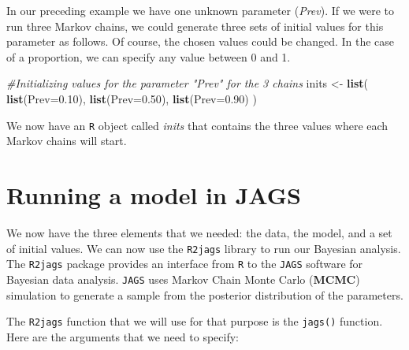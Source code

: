 \documentclass[
]{book}
\newenvironment{Shaded}{\begin{snugshade}}{\end{snugshade}}
\newcommand{\AttributeTok}[1]{\textcolor[rgb]{0.13,0.29,0.53}{#1}}
\newcommand{\CommentTok}[1]{\textcolor[rgb]{0.56,0.35,0.01}{\textit{#1}}}
\newcommand{\FloatTok}[1]{\textcolor[rgb]{0.00,0.00,0.81}{#1}}
\newcommand{\FunctionTok}[1]{\textcolor[rgb]{0.13,0.29,0.53}{\textbf{#1}}}
\newcommand{\NormalTok}[1]{#1}
\newcommand{\OtherTok}[1]{\textcolor[rgb]{0.56,0.35,0.01}{#1}}
\begin{document}
In our preceding example we have one unknown parameter (\emph{Prev}). If we were to run three Markov chains, we could generate three sets of initial values for this parameter as follows. Of course, the chosen values could be changed. In the case of a proportion, we can specify any value between 0 and 1.

\begin{Shaded}
\begin{Highlighting}[]
\CommentTok{\#Initializing values for the parameter "Prev" for the 3 chains}
\NormalTok{inits }\OtherTok{\textless{}{-}} \FunctionTok{list}\NormalTok{(}
  \FunctionTok{list}\NormalTok{(}\AttributeTok{Prev=}\FloatTok{0.10}\NormalTok{),}
  \FunctionTok{list}\NormalTok{(}\AttributeTok{Prev=}\FloatTok{0.50}\NormalTok{),}
  \FunctionTok{list}\NormalTok{(}\AttributeTok{Prev=}\FloatTok{0.90}\NormalTok{)}
\NormalTok{  )}
\end{Highlighting}
\end{Shaded}

We now have an \texttt{R} object called \emph{inits} that contains the three values where each Markov chains will start.

\section{Running a model in JAGS}\label{running-a-model-in-jags}

We now have the three elements that we needed: the data, the model, and a set of initial values. We can now use the \texttt{R2jags} library to run our Bayesian analysis. The \texttt{R2jags} package provides an interface from \texttt{R} to the \texttt{JAGS} software for Bayesian data analysis. \texttt{JAGS} uses Markov Chain Monte Carlo (\textbf{MCMC}) simulation to generate a sample from the posterior distribution of the parameters.

The \texttt{R2jags} function that we will use for that purpose is the \texttt{jags()} function. Here are the arguments that we need to specify:
\end{document}
